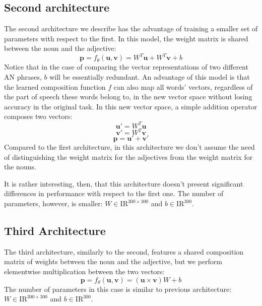 \subsection{Second architecture}

The second architecture we describe has the advantage of training a smaller set of parameters with respect to the first. In this model, the weight matrix is shared between the noun and the adjective:
\begin{equation}
\mathbf{p} = f_{\theta}(\mathbf{u}, \mathbf{v}) = W^T\mathbf{u} + W^T\mathbf{v} + b
\end{equation}
Notice that in the case of comparing the vector representations of two different AN phrases, $b$ will be essentially redundant. An advantage of this model is that the learned composition function $f$ can also map all words' vectors, regardless of the part of speech these words belong to, in the new vector space without losing accuracy in the original task. In this new vector space, a simple addition operator composes two vectors:
\begin{equation}
\mathbf{u}' = W^T\mathbf{u} 
\end{equation}
\begin{equation}
\mathbf{v}' = W^T\mathbf{v} 
\end{equation}
\begin{equation}
\mathbf{p} = \mathbf{u}' + \mathbf{v}'
\end{equation}
Compared to the first architecture, in this architecture we don't assume the need of distinguishing the weight matrix for the adjectives from the weight matrix for the  nouns. 

It is rather interesting, then, that this architecture doesn't present significant differences in performance with respect to the first one. The number of parameters, however, is smaller: $W \in \mathrm{I\!R}^{300 \times 300}$ and $b \in \mathrm{I\!R}^{300}$.

\subsection{Third Architecture}
The third architecture, similarly to the second, features a shared composition matrix of weights between the noun and the adjective, but we perform elementwise multiplication between the two vectors:
\begin{equation}
\mathbf{p} = f_{\theta}(\mathbf{u}, \mathbf{v}) = (\mathbf{u} \times \mathbf{v}) W + b
\end{equation}
The number of parameters in this case is similar to previous architecture: $W \in \mathrm{I\!R}^{300 \times 300}$ and $b \in \mathrm{I\!R}^{300}$.

